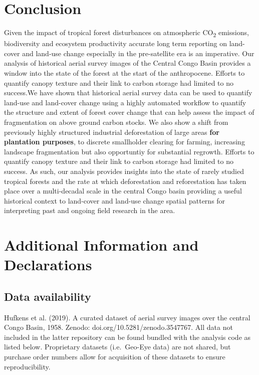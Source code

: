 \documentclass[remote sensing,article,submit,moreauthors,pdftex]{mdpi}
\begin{document}
\hypertarget{conclusion}{%
\section{Conclusion}\label{conclusion}}

Given the impact of tropical forest disturbances on atmospheric
CO\textsubscript{2} emissions, biodiversity and ecosystem productivity
accurate long term reporting on land-cover and land-use change
especially in the pre-satellite era is an imperative. Our analysis of
historical aerial survey images of the Central Congo Basin provides a
window into the state of the forest at the start of the anthropocene.
Efforts to quantify canopy texture and their link to carbon storage had
limited to no success.We have shown that historical aerial survey data
can be used to quantify land-use and land-cover change using a highly
automated workflow to quantify the structure and extent of forest cover
change that can help assess the impact of fragmentation on above ground
carbon stocks. We also show a shift from previously highly structured
industrial deforestation of large areas \textbf{for plantation
purposes}, to discrete smallholder clearing for farming, increasing
landscape fragmentation but also opportuntiy for substantial regrowth.
Efforts to quantify canopy texture and their link to carbon storage had
limited to no success. As such, our analysis provides insights into the
state of rarely studied tropical forests and the rate at which
deforestation and reforestation has taken place over a multi-decadal
scale in the central Congo basin providing a useful historical context
to land-cover and land-use change spatial patterns for interpreting past
and ongoing field research in the area.

\hypertarget{additional-information-and-declarations}{%
\section{Additional Information and
Declarations}\label{additional-information-and-declarations}}

\hypertarget{data-availability}{%
\subsection{Data availability}\label{data-availability}}

Hufkens et al. (2019). A curated dataset of aerial survey images over
the central Congo Basin, 1958. Zenodo: doi.org/10.5281/zenodo.3547767.
All data not included in the latter repository can be found bundled with
the analysis code as listed below. Proprietary datasets (i.e.~Geo-Eye
data) are not shared, but purchase order numbers allow for acquisition
of these datasets to ensure reproducibility.
\end{document}
